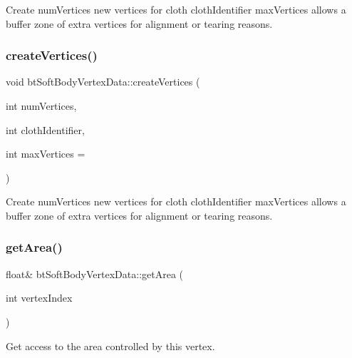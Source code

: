 Create num\+Vertices new vertices for cloth cloth\+Identifier max\+Vertices allows a buffer zone of extra vertices for alignment or tearing reasons. \mbox{\label{classbtSoftBodyVertexData_ac3ec63020379a29c984904deb4fc92b2}} 
\subsubsection{\texorpdfstring{create\+Vertices()}{createVertices()}\hspace{0.1cm}{\footnotesize\ttfamily [2/2]}}
{\footnotesize\ttfamily void bt\+Soft\+Body\+Vertex\+Data\+::create\+Vertices (\begin{DoxyParamCaption}\item[{int}]{num\+Vertices,  }\item[{int}]{cloth\+Identifier,  }\item[{int}]{max\+Vertices = {} }\end{DoxyParamCaption})\hspace{0.3cm}{\ttfamily [inline]}}

Create num\+Vertices new vertices for cloth cloth\+Identifier max\+Vertices allows a buffer zone of extra vertices for alignment or tearing reasons. \mbox{\label{classbtSoftBodyVertexData_aed372e4aa15c1101feabec4ea7fe80a2}} 
\subsubsection{\texorpdfstring{get\+Area()}{getArea()}\hspace{0.1cm}{\footnotesize\ttfamily [1/2]}}
{\footnotesize\ttfamily float\& bt\+Soft\+Body\+Vertex\+Data\+::get\+Area (\begin{DoxyParamCaption}\item[{int}]{vertex\+Index }\end{DoxyParamCaption})\hspace{0.3cm}{\ttfamily [inline]}}

Get access to the area controlled by this vertex. \mbox{\label{classbtSoftBodyVertexData_aed372e4aa15c1101feabec4ea7fe80a2}} 
